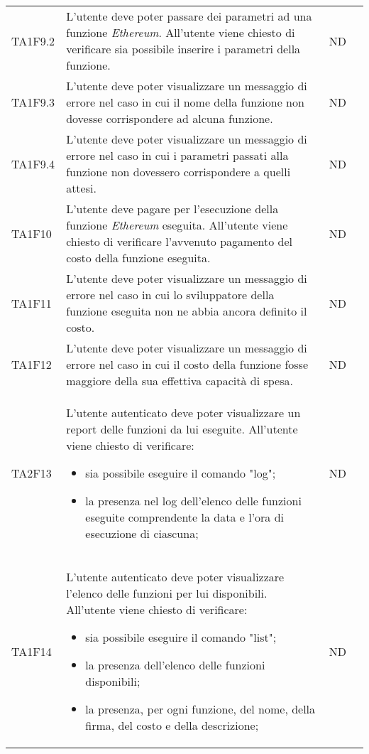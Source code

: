 \begin{longtable}{|C{1.5cm}|C{8cm}|C{3cm}|C{1cm}|}
	TA1F9.2  &
	L’utente deve poter passare dei parametri ad una funzione \textit{Ethereum\glos}. All’utente viene chiesto di verificare sia possibile inserire i parametri della funzione. &
	ND \\

	TA1F9.3  &
	L’utente deve poter visualizzare un messaggio di errore nel caso in cui il nome della funzione non dovesse corrispondere ad alcuna funzione. &
	ND \\

	TA1F9.4  &
	L’utente deve poter visualizzare un messaggio di errore nel caso in cui i parametri passati alla funzione non dovessero corrispondere a quelli attesi. &
	ND \\

	TA1F10  &
	L’utente deve pagare per l'esecuzione della funzione \textit{Ethereum\glos} eseguita.
	All’utente viene chiesto di verificare l'avvenuto pagamento del costo della funzione eseguita. &
	ND \\

	TA1F11  &
	L’utente deve poter visualizzare un messaggio di errore nel caso in cui lo sviluppatore della funzione eseguita non ne abbia ancora definito il costo. &
	ND \\

	TA1F12  &
	L’utente deve poter visualizzare un messaggio di errore nel caso in cui il costo della funzione fosse maggiore della sua effettiva capacità di spesa. &
	ND \\

	TA2F13  &
	L’utente autenticato deve poter visualizzare un report delle funzioni da lui eseguite. All’utente viene chiesto di verificare:
	\begin{itemize}
		\item sia possibile eseguire il comando "log";
		\item la presenza nel log dell'elenco delle funzioni eseguite comprendente la data e l'ora di esecuzione di ciascuna;
	\end{itemize} &
	ND \\[-5ex]

	TA1F14  &
	L’utente autenticato deve poter visualizzare l'elenco delle funzioni per lui disponibili. All’utente viene chiesto di verificare:
	\begin{itemize}
		\item sia possibile eseguire il comando "list";
		\item la presenza dell'elenco delle funzioni disponibili;
		\item la presenza, per ogni funzione, del nome, della firma, del costo e della descrizione;
	\end{itemize} &
	ND \\[-5ex]


\end{longtable}
